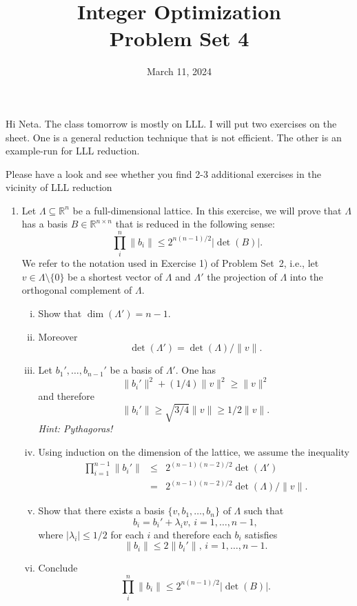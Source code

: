 \documentclass[11pt,a4paper]{article}
\title{Integer Optimization  \\ Problem Set 4 }
\date{ March 11, 2024}
\begin{document}
\maketitle 

Hi Neta. The class tomorrow is mostly on LLL. I will put two exercises on the sheet. One is a general reduction technique that is not efficient. The other is an example-run for LLL reduction.

Please have a look and see whether you find 2-3 additional exercises in the vicinity of LLL reduction 


\begin{enumerate}[1)] 
\item Let $Λ⊆ℝ^n$ be a full-dimensional lattice. In this exercise, we will prove that $Λ$ has a basis $B ∈ℝ^{n ×n}$  that is reduced in the following sense:
  \begin{displaymath}
   ∏_i^n \|b_i\| ≤ 2^{n (n-1)/2}  |\det (B)|.
 \end{displaymath}
 We refer to the notation used in Exercise 1) of Problem Set~2, i.e., let $v ∈Λ \setminus \{0\}$ be a shortest vector of $Λ$ and $Λ'$ the projection of $Λ$ into the orthogonal complement of $Λ$.
 \begin{enumerate}[i)]
 \item Show that $\dim(Λ') = n-1$.
 \item Moreover 
   \begin{displaymath}
     \det(Λ') = \det(Λ) / \|v\|.  
   \end{displaymath}
 \item Let $b_1', \dots , b_{n-1}'$ be a basis of $Λ'$. One has
   \begin{displaymath}
     \| b_i'\| ^2 + (1/4) \|v\|^2 ≥ \|v\|^2
   \end{displaymath}
   and therefore
   \begin{displaymath}
     \| b_i'\|   ≥ \sqrt{3/4}\|v\| ≥ 1/2 \|v\|. 
   \end{displaymath}
   \hfill{\emph{Hint: Pythagoras!}} 
 \item Using induction on the dimension of the lattice, we assume the inequality
   \begin{eqnarray*}
     ∏_{i=1}^{n-1}  \| b_i'\| & ≤ &   2^{(n-1) (n-2)/2}  \det (Λ') \\
                            & =  & 2^{(n-1) (n-2)/2}  \det (Λ) /\|v\|. 
   \end{eqnarray*}
 \item Show that there exists a basis $\{v,b_1,\dots,b_n\}$ of $Λ$ such that
   \begin{displaymath}
     b_i = b_i' + λ_i v ,  \,   i=1,\dots,n-1,
   \end{displaymath}
   where $|λ_i | ≤ 1/2$ for each $i$ and therefore each $b_i$ satisfies
   \begin{displaymath}
     \| b_i\|  ≤  2 \| b_i'\|, \, i=1,\dots,n-1.
   \end{displaymath}
 \item    Conclude
   \begin{displaymath}
         ∏_i^n \|b_i\| ≤ 2^{n (n-1)/2}  |\det (B)|.
   \end{displaymath}


\end{enumerate}
\end{enumerate}
\end{document}
